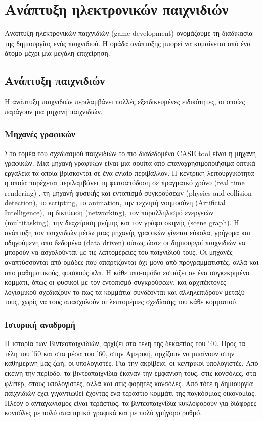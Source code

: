 \chapter{Aνάπτυξη ηλεκτρονικών παιχνιδιών}
Aνάπτυξη ηλεκτρονικών παιχνιδιών (game development) ονομάζουμε τη διαδικασία της δημιουργίας ενός παιχνιδιού. Η ομάδα ανάπτυξης μπορεί να κυμαίνεται από ένα άτομο μέχρι μια μεγάλη επιχείρηση.			
	\section{Ανάπτυξη παιχνιδιών}
	Η ανάπτυξη παιχνιδιών περιλαμβάνει πολλές εξειδικευμένες ειδικότητες, οι οποίες παράγουν μια μηχανή παιχνιδιών.
	\subsection{Μηχανές γραφικών}	
	Στο τομέα του σχεδιασμού παιχνιδιών το πιο διαδεδομένο CASE tool είναι η μηχανή γραφικών. Μια μηχανή γραφικών είναι μια σουίτα από επαναχρησιμοποιήσιμα οπτικά εργαλεία τα οποία βρίσκονται σε ένα ενιαίο περιβάλλον.
	Η κεντρική λειτουργικότητα η οποία παρέχεται περιλαμβάνει τη φωτοαπόδοση σε πραγματκό χρόνο (real time rendering) , τη μηχανή φυσικής και εντοπισμό συγκρούσεων (physics and collision detection), το scripting, το animation, την τεχνητή νοημοσύνη (Artificial Intelligence), τη δικτύωση (networking), τον παραλληλισμό ενεργειών (multitasking), την διαχείριση μνήμης και τον γράφο σκηνής (scene graph). Η ανάπτυξη τον παιχνιδιών μέσω μιας μηχανής γραφικών γίνεται εύκολα, γρήγορα και οδηγούμενη απο δεδομένα (data driven) ούτως ώστε οι δημιουργοί παιχνιδιών να μπορούν να ασχολούνται με τις λεπτομέρειες του παιχνιδιού τους.
	Οι μηχανές αναπτύσσονται από ομάδες που απαρτίζονται όχι μόνο από προγραμματιστές, αλλά και απο μαθηματικούς, φυσικούς κλπ. Η κάθε υπο-ομάδα εστιάζει σε ένα συγκεκριμένο κομμάτι, όπως οι φυσικοί με τον εντοπισμό συγκρούσεων, και αρχιτέκτονες λογισμικού σχεδιάζουν το πως τα κομμάτια συνδέονται και αλληλεπιδρούν μεταξύ τους, χωρίς να τους απασχολούν οι λεπτομέριες σχεδίασης του κάθε κομματιού.
	
	\subsection{Ιστορική αναδρομή}
	Η ιστορία των Βιντεοπαιχνιδιών, αρχίζει στα τέλη της δεκαετίας του '40. Προς τα τέλη του '50 και στα μέσα του '60, στην Αμερική, αρχίζουν να μπαίνουν στην καθημερινή μας ζωή, οι υπολογιστές. Για την ακρίβεια, οι κεντρικοί υπολογιστές. Από εκείνη την περίοδο, τα βιντεοπαιχνίδια έκαναν την εμφάνιση τους, στις κονσόλες, στα φλίπερ, στους υπολογιστές, αλλά και στις φορητές κονσόλες. Από τότε η δημιουργία παιχνιδιών έχει γιγαντιωθεί έχοντας ένα τεράστιο κομμάτι της παγκόσμιας οικονομίας.
	Πλέον ο ανταγωνισμός είναι τεράστιος, τα βιντεοπαιχνίδια κυκλοφορούν για διάφορες κονσόλες με  πολύ απαιτητικά γραφικά και με πολύ γρήγορο ρυθμό.
